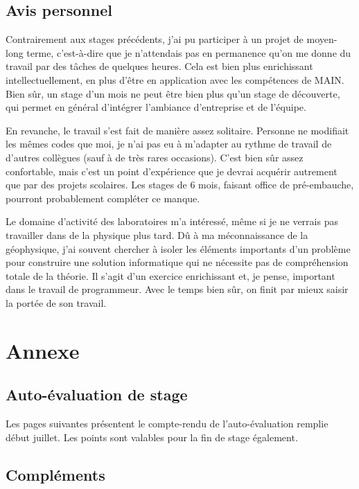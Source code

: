 \documentclass[12pt]{article}
\begin{document}
\subsection{Avis personnel}

    Contrairement aux stages précédents, j'ai pu participer à un projet de moyen-long terme, c'est-à-dire que je n'attendais pas en permanence qu'on me donne du travail par des tâches de quelques heures. Cela est bien plus enrichissant intellectuellement, en plus d'être en application avec les compétences de MAIN. Bien sûr, un stage d'un mois ne peut être bien plus qu'un stage de découverte, qui permet en général d'intégrer l'ambiance d'entreprise et de l'équipe.

    En revanche, le travail s'est fait de manière assez solitaire. Personne ne modifiait les mêmes codes que moi, je n'ai pas eu à m'adapter au rythme de travail de d'autres collègues (sauf à de très rares occasions). C'est bien sûr assez confortable, mais c'est un point d'expérience que je devrai acquérir autrement que par des projets scolaires. Les stages de 6 mois, faisant office de pré-embauche, pourront probablement compléter ce manque.

    Le domaine d'activité des laboratoires m'a intéressé, même si je ne verrais pas travailler dans de la physique plus tard. Dû à ma méconnaissance de la géophysique, j'ai souvent chercher à isoler les éléments importants d'un problème pour construire une solution informatique qui ne nécessite pas de compréhension totale de la théorie. Il s'agit d'un exercice enrichissant et, je pense, important dans le travail de programmeur. Avec le temps bien sûr, on finit par mieux saisir la portée de son travail.

    

\section{Annexe}
\subsection{Auto-évaluation de stage}

    Les pages suivantes présentent le compte-rendu de l'auto-évaluation remplie début juillet. Les points sont valables pour la fin de stage également.
    

\subsection{Compléments}
\end{document}
